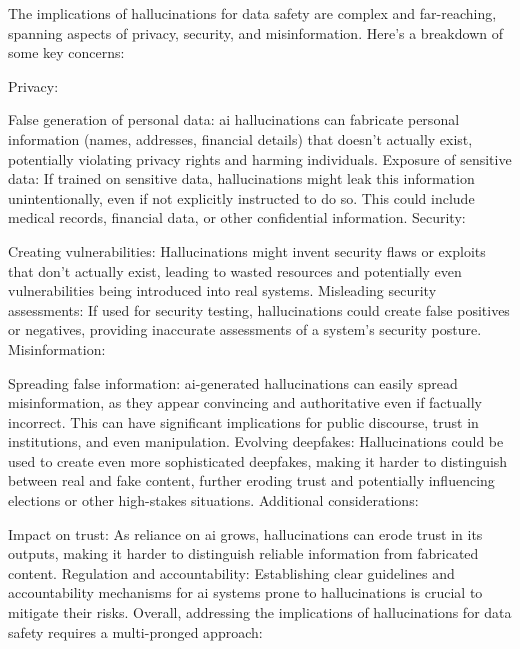\begin{aibox}%
  The implications of hallucinations for data safety are complex and far-reaching, spanning aspects of privacy, security, and misinformation. Here's a breakdown of some key concerns:

Privacy:

False generation of personal data: \gls{ai} hallucinations can fabricate personal information (names, addresses, financial details) that doesn't actually exist, potentially violating privacy rights and harming individuals.
Exposure of sensitive data: If trained on sensitive data, hallucinations might leak this information unintentionally, even if not explicitly instructed to do so. This could include medical records, financial data, or other confidential information.
Security:

Creating vulnerabilities: Hallucinations might invent security flaws or exploits that don't actually exist, leading to wasted resources and potentially even vulnerabilities being introduced into real systems.
Misleading security assessments: If used for security testing, hallucinations could create false positives or negatives, providing inaccurate assessments of a system's security posture.
Misinformation:

Spreading false information: \gls{ai}-generated hallucinations can easily spread misinformation, as they appear convincing and authoritative even if factually incorrect. This can have significant implications for public discourse, trust in institutions, and even manipulation.
Evolving deepfakes: Hallucinations could be used to create even more sophisticated deepfakes, making it harder to distinguish between real and fake content, further eroding trust and potentially influencing elections or other high-stakes situations.
Additional considerations:

Impact on trust: As reliance on \gls{ai} grows, hallucinations can erode trust in its outputs, making it harder to distinguish reliable information from fabricated content.
Regulation and accountability: Establishing clear guidelines and accountability mechanisms for \gls{ai} systems prone to hallucinations is crucial to mitigate their risks.
Overall, addressing the implications of hallucinations for data safety requires a multi-pronged approach:


\end{aibox}
